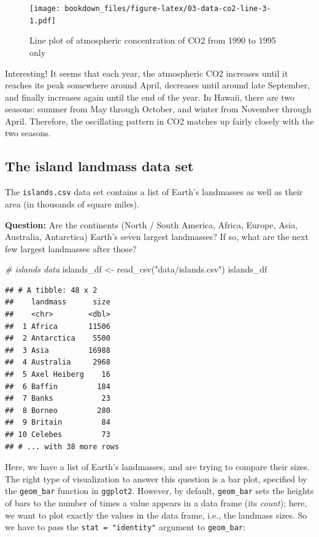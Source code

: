 \documentclass[
]{krantz}
\makeatletter
\newenvironment{Shaded}{\begin{snugshade}}{\end{snugshade}}
\newcommand{\CommentTok}[1]{\textcolor[rgb]{0.37,0.37,0.37}{\textit{#1}}}
\newcommand{\FunctionTok}[1]{\textcolor[rgb]{0,0,0}{#1}}
\newcommand{\NormalTok}[1]{#1}
\newcommand{\OtherTok}[1]{\textcolor[rgb]{0.37,0.37,0.37}{#1}}
\newcommand{\StringTok}[1]{\textcolor[rgb]{0.5,0.5,0.5}{#1}}
\newenvironment{kframe}{%
\medskip{}
\setlength{\fboxsep}{.8em}
 \def\at@end@of@kframe{}%
 \ifinner\ifhmode%
  \def\at@end@of@kframe{\end{minipage}}%
  \begin{minipage}{\columnwidth}%
 \fi\fi%
 \def\FrameCommand##1{\hskip\@totalleftmargin \hskip-\fboxsep
 \colorbox{shadecolor}{##1}\hskip-\fboxsep
     \hskip-\linewidth \hskip-\@totalleftmargin \hskip\columnwidth}%
 \MakeFramed {\advance\hsize-\width
   \@totalleftmargin\z@ \linewidth\hsize
   \@setminipage}}%
 {\par\unskip\endMakeFramed%
 \at@end@of@kframe}
\renewenvironment{Shaded}{\begin{kframe}}{\end{kframe}}
\makeatother
\begin{document}
\begin{figure}
\centering
\texttt{[image: bookdown\_files/figure-latex/03-data-co2-line-3-1.pdf]}
\caption{\label{fig:03-data-co2-line-3}Line plot of atmospheric concentration of CO2 from 1990 to 1995 only}
\end{figure}

Interesting! It seems that each year, the atmospheric CO2 increases until it reaches its peak somewhere around April, decreases until around late September,
and finally increases again until the end of the year. In Hawaii, there are two seasons: summer from May through October, and winter from November through April.
Therefore, the oscillating pattern in CO2 matches up fairly closely with the two seasons.

\hypertarget{the-island-landmass-data-set}{%
\subsection{The island landmass data set}\label{the-island-landmass-data-set}}

The \texttt{islands.csv} data set contains a list of Earth's landmasses as well as their area (in thousands of square miles).

\textbf{Question:} Are the continents (North / South America, Africa, Europe, Asia, Australia, Antarctica) Earth's seven largest landmasses? If so, what are the next few largest landmasses after those?

\begin{Shaded}
\begin{Highlighting}[]
\CommentTok{\# islands data}
\NormalTok{islands\_df }\OtherTok{\textless{}{-}} \FunctionTok{read\_csv}\NormalTok{(}\StringTok{"data/islands.csv"}\NormalTok{)}
\NormalTok{islands\_df}
\end{Highlighting}
\end{Shaded}

\begin{verbatim}
## # A tibble: 48 x 2
##    landmass      size
##    <chr>        <dbl>
##  1 Africa       11506
##  2 Antarctica    5500
##  3 Asia         16988
##  4 Australia     2968
##  5 Axel Heiberg    16
##  6 Baffin         184
##  7 Banks           23
##  8 Borneo         280
##  9 Britain         84
## 10 Celebes         73
## # ... with 38 more rows
\end{verbatim}

Here, we have a list of Earth's landmasses, and are trying to compare their sizes. The right type of visualization to answer this
question is a bar plot, specified by the \texttt{geom\_bar} function in \texttt{ggplot2}. However, by default, \texttt{geom\_bar} sets the heights
of bars to the number of times a value appears in a data frame (its \emph{count}); here, we want to plot exactly the values in the data frame, i.e.,
the landmass sizes. So we have to pass the \texttt{stat\ =\ "identity"} argument to \texttt{geom\_bar}:
\end{document}
